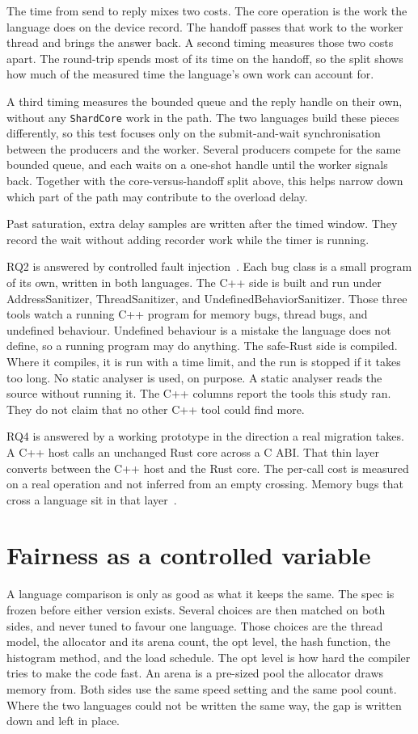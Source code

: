 \documentclass[english,oneside,a4paper,censored,csm,software-track-2020]{HYthesisML}
\begin{document}
The time from send to reply mixes two costs. The core operation is the work
the language does on the device record. The handoff passes that work to the
worker thread and brings the answer back. A second timing measures those
two costs apart. The round-trip spends most of its time on the handoff, so
the split shows how much of the measured time the language's own work can
account for. 

A third timing measures the bounded queue and the reply handle on their own, 
without any \texttt{ShardCore} work in the path. 
The two languages build these pieces differently, so this test focuses only on 
the submit-and-wait synchronisation between the producers and the worker. 
Several producers compete for the same bounded queue, and each waits on a
one-shot handle until the worker signals back. Together with the core-versus-handoff
split above, this helps narrow down which part of the path may contribute to the 
overload delay.

Past saturation, extra delay samples are written after the timed window.
They record the wait without adding recorder work while the timer is
running.

RQ2 is answered by controlled fault injection~\cite{natella2016fault}. Each
bug class is a small program of its own, written in both languages. The C++
side is built and run under AddressSanitizer, ThreadSanitizer, and
UndefinedBehaviorSanitizer. Those three tools watch a running C++ program
for memory bugs, thread bugs, and undefined behaviour. Undefined behaviour
is a mistake the language does not define, so a running program may do
anything. The safe-Rust side is compiled. Where it compiles, it is run with
a time limit, and the run is stopped if it takes too long. No static
analyser is used, on purpose. A static analyser reads the source without
running it. The C++ columns report the tools this study ran. They do not
claim that no other C++ tool could find more.

RQ4 is answered by a working
prototype in the direction a real migration takes. A C++ host calls an
unchanged Rust core across a C ABI. That thin layer converts between the C++ host and the Rust core.
The per-call cost is measured on a real
operation and not inferred from an empty crossing. Memory bugs that cross a
language sit in that layer~\cite{li2022crosslang}.

\section{Fairness as a controlled variable}\label{sec:controlsbrief}
A language comparison is only as good as what it keeps the same. The spec
is frozen before either version exists. Several choices are then matched on
both sides, and never tuned to favour one language. Those choices are the
thread model, the allocator and its arena count, the opt level, the hash
function, the histogram method, and the load schedule. The opt level is how
hard the compiler tries to make the code fast. An arena is a pre-sized pool
the allocator draws memory from. Both sides use the same speed setting and
the same pool count. Where the two languages could not be written the same
way, the gap is written down and left in place.
\end{document}

